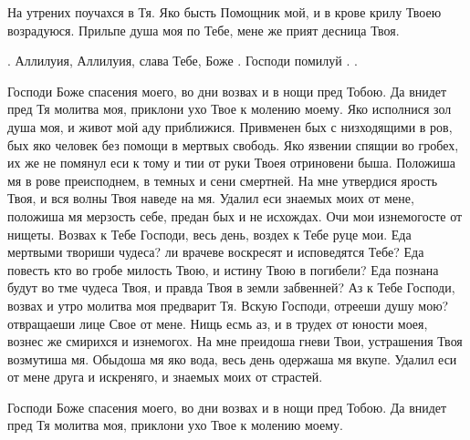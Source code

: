 \begin{mymulticols}
На утрених поучахся в Тя. Яко бысть Помощник мой, и в крове крилу Твоею возрадуюся. Прильпе душа моя по Тебе, мене же прият десница Твоя. 

. Аллилуия, Аллилуия, слава Тебе, Боже . Господи помилуй . .




Господи Боже спасения моего, во дни возвах и в нощи пред Тобою. Да внидет пред Тя молитва моя, приклони ухо Твое к молению моему. Яко исполнися зол душа моя, и живот мой аду приближися. Привменен бых с низходящими в ров, бых яко человек без помощи в мертвых свободь. Яко язвении спящии во гробех, их же не помянул еси к тому и тии от руки Твоея отриновени быша. Положиша мя в рове преисподнем, в темных и сени смертней. На мне утвердися ярость Твоя, и вся волны Твоя наведе на мя. Удалил еси знаемых моих от мене, положиша мя мерзость себе, предан бых и не исхождах. Очи мои изнемогосте от нищеты. Возвах к Тебе Господи, весь день, воздех к Тебе руце мои. Еда мертвыми твориши чудеса? ли врачеве воскресят и исповедятся Тебе? Еда повесть кто во гробе милость Твою, и истину Твою в погибели? Еда познана будут во тме чудеса Твоя, и правда Твоя в земли забвенней? Аз к Тебе Господи, возвах и утро молитва моя предварит Тя. Вскую Господи, отрееши душу мою? отвращаеши лице Свое от мене. Нищь есмь аз, и в трудех от юности моея, вознес же смирихся и изнемогох. На мне преидоша гневи Твои, устрашения Твоя возмутиша мя. Обыдоша мя яко вода, весь день одержаша мя вкупе. Удалил еси от мене друга и искреняго, и знаемых моих от страстей.

Господи Боже спасения моего, во дни возвах и в нощи пред Тобою. Да внидет пред Тя молитва моя, приклони ухо Твое к молению моему.





\end{mymulticols}
